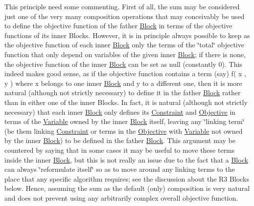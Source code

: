 This principle need some commenting. First of all, the sum may be considered just one of the very many composition operations that may conceivably be used to define the objective function of the father \mbox{\hyperlink{class_s_m_spp__di__unipi__it_1_1_block}{Block}} in terms of the objective functions of its inner Blocks. However, it is in principle always possible to keep as the objective function of each inner \mbox{\hyperlink{class_s_m_spp__di__unipi__it_1_1_block}{Block}} only the terms of the \char`\"{}total\char`\"{} objective function that only depend on variables of the given inner \mbox{\hyperlink{class_s_m_spp__di__unipi__it_1_1_block}{Block}}; if there is none, the objective function of the inner \mbox{\hyperlink{class_s_m_spp__di__unipi__it_1_1_block}{Block}} can be set as null (constantly 0). This indeed makes good sense, as if the objective function contains a term (say) f( x , y ) where x belongs to one inner \mbox{\hyperlink{class_s_m_spp__di__unipi__it_1_1_block}{Block}} and y to a different one, then it is more natural (although not strictly necessary) to define it in the father \mbox{\hyperlink{class_s_m_spp__di__unipi__it_1_1_block}{Block}} rather than in either one of the inner Blocks. In fact, it is natural (although not strictly necessary) that each inner \mbox{\hyperlink{class_s_m_spp__di__unipi__it_1_1_block}{Block}} only defines its \mbox{\hyperlink{class_s_m_spp__di__unipi__it_1_1_constraint}{Constraint}} and \mbox{\hyperlink{class_s_m_spp__di__unipi__it_1_1_objective}{Objective}} in terms of the \mbox{\hyperlink{class_s_m_spp__di__unipi__it_1_1_variable}{Variable}} owned by the inner \mbox{\hyperlink{class_s_m_spp__di__unipi__it_1_1_block}{Block}} itself, leaving any \char`\"{}linking term\char`\"{} (be them linking \mbox{\hyperlink{class_s_m_spp__di__unipi__it_1_1_constraint}{Constraint}} or terms in the \mbox{\hyperlink{class_s_m_spp__di__unipi__it_1_1_objective}{Objective}} with \mbox{\hyperlink{class_s_m_spp__di__unipi__it_1_1_variable}{Variable}} not owned by the inner \mbox{\hyperlink{class_s_m_spp__di__unipi__it_1_1_block}{Block}}) to be defined in the father \mbox{\hyperlink{class_s_m_spp__di__unipi__it_1_1_block}{Block}}. This argument may be countered by saying that in some cases it may be useful to move these terms inside the inner \mbox{\hyperlink{class_s_m_spp__di__unipi__it_1_1_block}{Block}}, but this is not really an issue due to the fact that a \mbox{\hyperlink{class_s_m_spp__di__unipi__it_1_1_block}{Block}} can always \char`\"{}reformulate itself\char`\"{} so as to move around any linking terms to the place that any specific algorithm requires; see the discussion about the R3 Blocks below. Hence, assuming the sum as the default (only) composition is very natural and does not prevent using any arbitrarily complex overall objective function.

